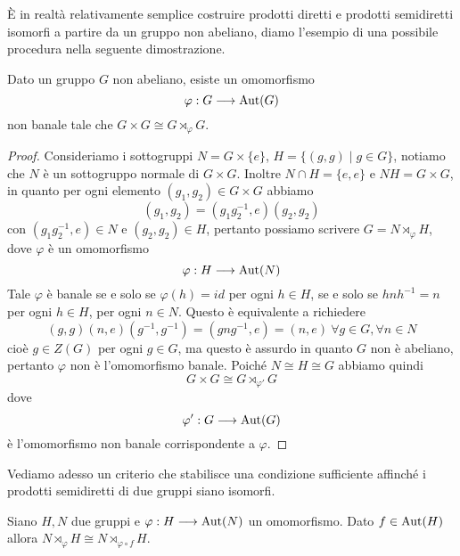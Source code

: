\documentclass[11pt]{scrartcl}
\begin{document}
È in realtà relativamente semplice costruire prodotti diretti e prodotti semidiretti
isomorfi a partire da un gruppo non abeliano, diamo l'esempio di una possibile
procedura nella seguente dimostrazione.

\begin{proposition}
    Dato un gruppo $G$ non abeliano, esiste un omomorfismo
    \[
        \varphi: G\longrightarrow \operatorname{Aut}(G)
    \]
    non banale tale che $G\times G \cong G\rtimes_{\varphi} G$.
\end{proposition}

\begin{proof}
    Consideriamo i sottogruppi $N = G\times\{e\}$, $H = \{(g, g) \mid g \in G\}$,
    notiamo che $N$ è un sottogruppo normale di $G\times G$. Inoltre 
    $N\cap H = \{e, e\}$ e $NH = G\times G$, in quanto per 
    ogni elemento $(g_1, g_2) \in G\times G$ abbiamo
    \[
        (g_1, g_2) = (g_1g_2^{-1}, e)(g_2, g_2)
    \]
    con $(g_1g_2^{-1}, e) \in N$ e $(g_2, g_2) \in H$, pertanto possiamo 
    scrivere $G = N \rtimes_{\varphi} H$, dove $\varphi$ è un omomorfismo
    \[
        \varphi: H \longrightarrow \operatorname{Aut}(N)
    \]
    Tale $\varphi$ è banale se e solo se $\varphi(h) = id$ per ogni $h \in H$,
    se e solo se $hnh^{-1} = n$ per ogni $h \in H$, per ogni $n \in N$.
    Questo è equivalente a richiedere 
    \[
        (g, g)(n, e)(g^{-1}, g^{-1}) = (gng^{-1}, e)= (n, e)~\forall g \in G,\forall n \in N
    \]
    cioè $g \in Z(G)$ per ogni $g \in G$,
    ma questo è assurdo in quanto $G$ non è abeliano, pertanto $\varphi$
    non è l'omomorfismo banale. Poiché $N \cong H \cong G$ abbiamo quindi
    \[
        G \times G \cong G\rtimes_{\varphi'}G
    \]
    dove
    \[
        \varphi':G \longrightarrow \operatorname{Aut}(G)
    \]
    è l'omomorfismo non banale corrispondente a $\varphi$.
\end{proof}

Vediamo adesso un criterio che stabilisce una condizione sufficiente affinché 
i prodotti semidiretti di due gruppi siano isomorfi.

\begin{proposition}
    \label{prop1.74}
    Siano $H, N$ due gruppi e $\varphi: H \longrightarrow \operatorname{Aut}(N)$ un omomorfismo.
    Dato $f \in \operatorname{Aut}(H)$ allora $N\rtimes_{\varphi} H \cong N\rtimes_{\varphi\circ f} H$.
\end{proposition}
\end{document}
